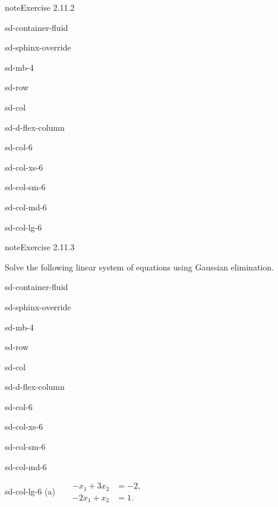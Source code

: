 \documentclass[letterpaper,10pt,english]{jupyterBook}
\begin{document}
\begin{sphinxadmonition}{note}{Exercise 2.11.2}
\begin{sphinxuseclass}{sd-container-fluid}
\begin{sphinxuseclass}{sd-sphinx-override}
\begin{sphinxuseclass}{sd-mb-4}
\begin{sphinxuseclass}{sd-row}
\begin{sphinxuseclass}{sd-col}
\begin{sphinxuseclass}{sd-d-flex-column}
\begin{sphinxuseclass}{sd-col-6}
\begin{sphinxuseclass}{sd-col-xs-6}
\begin{sphinxuseclass}{sd-col-sm-6}
\begin{sphinxuseclass}{sd-col-md-6}
\begin{sphinxuseclass}{sd-col-lg-6}
\end{sphinxuseclass}
\end{sphinxuseclass}
\end{sphinxuseclass}
\end{sphinxuseclass}
\end{sphinxuseclass}
\end{sphinxuseclass}
\end{sphinxuseclass}
\end{sphinxuseclass}
\end{sphinxuseclass}
\end{sphinxuseclass}
\end{sphinxuseclass}\end{sphinxadmonition}
 \label{exercise:systems-ex-gelim}

\begin{sphinxadmonition}{note}{Exercise 2.11.3}



\sphinxAtStartPar
Solve the following linear system of equations using Gaussian elimination.

\begin{sphinxuseclass}{sd-container-fluid}
\begin{sphinxuseclass}{sd-sphinx-override}
\begin{sphinxuseclass}{sd-mb-4}
\begin{sphinxuseclass}{sd-row}
\begin{sphinxuseclass}{sd-col}
\begin{sphinxuseclass}{sd-d-flex-column}
\begin{sphinxuseclass}{sd-col-6}
\begin{sphinxuseclass}{sd-col-xs-6}
\begin{sphinxuseclass}{sd-col-sm-6}
\begin{sphinxuseclass}{sd-col-md-6}
\begin{sphinxuseclass}{sd-col-lg-6}
\sphinxAtStartPar
(a)  
\( \begin{align*}
     - x_{1} + 3 x_{2} &= -2, \\
     - 2 x_{1} +  x_{2} &= 1.
\end{align*} \)


\end{sphinxuseclass}
\end{sphinxuseclass}
\end{sphinxuseclass}
\end{sphinxuseclass}
\end{sphinxuseclass}
\end{sphinxuseclass}
\end{sphinxuseclass}
\end{sphinxuseclass}
\end{sphinxuseclass}
\end{sphinxuseclass}
\end{sphinxuseclass}
\end{sphinxadmonition}
\end{document}
